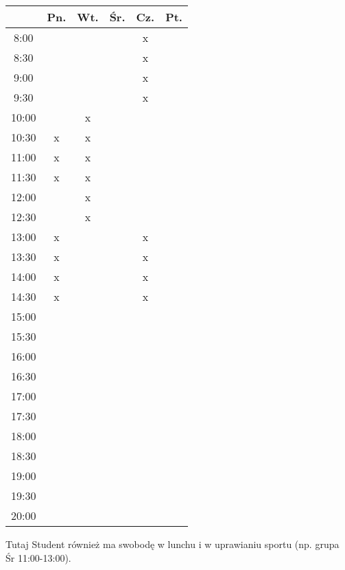 \documentclass{article}
\theoremstyle{definition}
\theoremstyle{remark}
\theoremstyle{plain}
\theoremstyle{remark}
\theoremstyle{plain}
\begin{document}
\begin{table}[H]
	\centering
	\begin{tabular}{c|c|c|c|c|c}
		& Pn. & Wt. & Śr. & Cz. & Pt.\\\hline
		8:00 & & & & x & \\\hline
		8:30 & & & & x & \\\hline
		9:00 & & & & x & \\\hline
		9:30 & & & & x & \\\hline
		10:00 & & x & & & \\\hline
		10:30 & x & x & & & \\\hline
		11:00 & x & x & & & \\\hline
		11:30 & x & x & & & \\\hline
		12:00 & & x & & & \\\hline
		12:30 & & x & & & \\\hline
		13:00 & x & & & x & \\\hline
		13:30 & x & & & x & \\\hline
		14:00 & x & & & x & \\\hline
		14:30 & x & & & x & \\\hline
		15:00 & & & & & \\\hline
		15:30 & & & & & \\\hline
		16:00 & & & & & \\\hline
		16:30 & & & & & \\\hline
		17:00 & & & & & \\\hline
		17:30 & & & & & \\\hline
		18:00 & & & & & \\\hline
		18:30 & & & & & \\\hline
		19:00 & & & & & \\\hline
		19:30 & & & & & \\\hline
        20:00 & & & & & \\\hline
	\end{tabular}
\end{table}

Tutaj Student również ma swobodę w lunchu i w uprawianiu sportu (np. grupa Śr 11:00-13:00).
\end{document}
